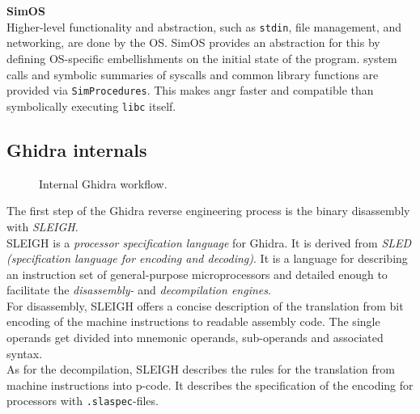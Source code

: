 \documentclass[seminar]{plai}
\begin{document}
\\\\
\textbf{SimOS}\\
Higher-level functionality and abstraction, such as \texttt{stdin}, file management, and networking, are done by the OS.
SimOS provides an abstraction for this by defining OS-specific embellishments on the initial state of the program.
system calls and symbolic summaries of \texttt{}{syscalls} and common library functions are provided via \texttt{SimProcedures}.
This makes angr faster and compatible than symbolically executing \texttt{libc} itself.

\subsection{Ghidra internals}
\label{sec:angr-internals}
\begin{figure}[htbp]
\centering
{}
\caption{Internal Ghidra workflow.\cite{formal-semantics-for-P-Code}}
\label{fig:ghidra-flow}
\end{figure}

\noindent The first step of the Ghidra reverse engineering process is the binary disassembly with \textit{SLEIGH}.\cite{formal-semantics-for-P-Code}\\
SLEIGH is a \textit{processor specification language} for Ghidra. It is derived from \textit{SLED (specification language for encoding and decoding)}.
It is a language for describing an instruction set of general-purpose microprocessors and detailed enough to facilitate the \textit{disassembly-} and \textit{decompilation engines}.\\
For disassembly, SLEIGH offers a concise description of the translation from bit encoding of the machine instructions to readable assembly code. The single operands get divided into mnemonic operands, sub-operands and associated syntax.\cite{sleigh-a-language-for-rapid-processor-specification}\\
As for the decompilation, SLEIGH describes the rules for the translation from machine instructions into p-code.
It describes the specification of the encoding for processors with \texttt{.slaspec}-files.\cite{sleigh-a-language-for-rapid-processor-specification, ghidra-book-definite-guide}
\end{document}
